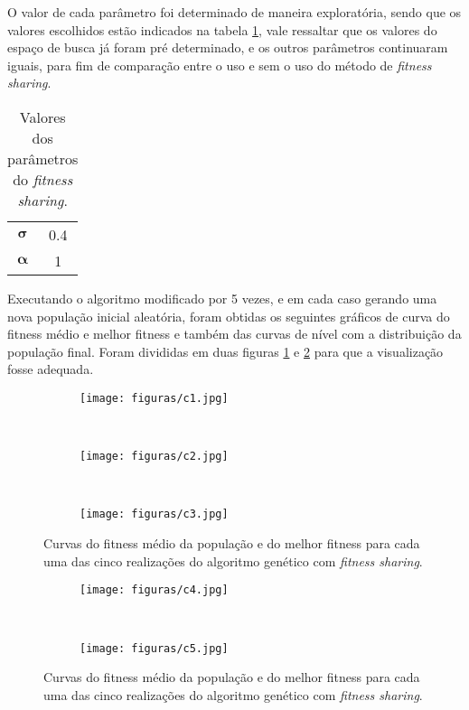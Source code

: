 \documentclass[a4paper, 12pt]{article}
\newcommand{\fitsha}{\textit{fitness sharing}\xspace}
\begin{document}
O valor de cada parâmetro foi determinado de maneira exploratória, sendo que os valores escolhidos estão indicados na tabela \ref{tab:valores-parametros2}, vale ressaltar que os valores do espaço de busca já foram pré determinado, e os outros parâmetros continuaram iguais, para fim de comparação entre o uso e sem o uso do método de \fitsha.
\begin{table}[H]
    \centering
    \begin{tabular}{c c}
    \toprule
        $\bm{\sigma}$ & 0.4\\
        $\bm{\alpha}$ & 1\\
    \bottomrule
    \end{tabular}
    \caption{Valores dos parâmetros do \fitsha.}
    \label{tab:valores-parametros2}
\end{table}

Executando o algoritmo modificado por 5 vezes, e em cada caso gerando uma nova população inicial aleatória, foram obtidas os seguintes gráficos de curva do fitness médio e melhor fitness e também das curvas de nível com a distribuição da população final. Foram divididas em duas figuras \ref{fig:curvas3} e \ref{fig:curvas4} para que a visualização fosse adequada. 

\begin{figure}[!ht]
\centering
\begin{subfigure}{0.8\textwidth}
    \texttt{[image: figuras/c1.jpg]}
\end{subfigure}
\hfill
\\
\centering
\begin{subfigure}{0.8\textwidth}
    \texttt{[image: figuras/c2.jpg]}
\end{subfigure}
\hfill
\\
\centering
\begin{subfigure}{0.8\textwidth}
    \texttt{[image: figuras/c3.jpg]}
\end{subfigure}
\hfill
\caption{Curvas do fitness médio da população e do melhor fitness para cada uma das cinco realizações do algoritmo genético com \fitsha.}
\label{fig:curvas3}
\end{figure}
\begin{figure}[!ht]
\centering
\begin{subfigure}{0.8\textwidth}
    \texttt{[image: figuras/c4.jpg]}
\end{subfigure}
\hfill
\\
\centering
\begin{subfigure}{0.8\textwidth}
    \texttt{[image: figuras/c5.jpg]}
\end{subfigure}
\hfill
\caption{Curvas do fitness médio da população e do melhor fitness para cada uma das cinco realizações do algoritmo genético com \fitsha.}
\label{fig:curvas4}
\end{figure}
\end{document}
